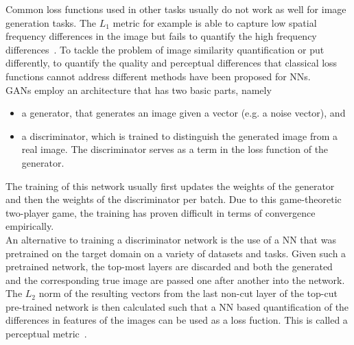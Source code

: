 Common loss functions used in other tasks usually do not work as well for image generation tasks.
The $L_1$ metric for example is able to capture low spatial frequency differences in the image but fails to quantify the high frequency differences~\autocite{isola_image-image_2017}.
To tackle the problem of image similarity quantification or put differently, to quantify the quality and perceptual differences that classical loss functions cannot address different methods have been proposed for NNs. \\

GANs employ an architecture that has two basic parts, namely
\begin{itemize}
 \item a generator, that generates an image given a vector (e.g. a noise vector), and
 \item a discriminator, which is trained to distinguish the generated image from a real image. The discriminator serves as a term in the loss function of the generator.
\end{itemize}
The training of this network usually first updates the weights of the generator and then the weights of the discriminator per batch.
Due to this game-theoretic two-player game, the training has proven difficult in terms of convergence empirically. \\

An alternative to training a discriminator network is the use of a NN that was pretrained on the target domain on a variety of datasets and tasks.
Given such a pretrained network, the top-most layers are discarded and both the generated and the corresponding true image are passed one after another into the network.
The $L_2$ norm of the resulting vectors from the last non-cut layer of the top-cut pre-trained network is then calculated such that a NN based quantification of the differences in features of the images can be used as a loss fuction.
This is called a perceptual metric~\autocite{zhang_unreasonable_2018}. \\

